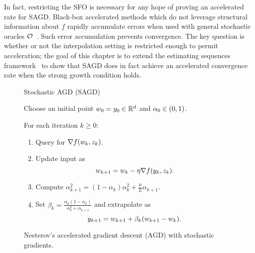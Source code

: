 In fact, restricting the \ac{SFO} is necessary for any hope of proving an accelerated rate for \ac{SAGD}.
Black-box accelerated methods which do not leverage structural information about \( f \) rapidly accumulate errors when used with general stochastic oracles \( \oracle{} \)~\citep{devolder2014first, schmidt2011convergence}. 
Such error accumulation prevents convergence. 
The key question is whether or not the interpolation setting is restricted enough to permit acceleration;
the goal of this chapter is to extend the estimating sequences framework~\citep{nesterov2004lectures} to show that \ac{SAGD} does in fact achieve an accelerated convergence rate when the strong growth condition holds.

\begin{figure}[t]
    \centering
    \begin{procedure}{Stochastic \ac{AGD} (\ac{SAGD})}
    \item Choose an initial point \( \w_0 = y_0 \in \R^d \) and \( \alpha_0 \in \rbr{0,1} \).
        \item For each iteration \( k \geq 0 \):
            \begin{enumerate}
                \item Query \oracle{} for \( \grad(\wk, \zk) \). 
                \item Update input as\vspace{-1ex}%
                \[ \wkk = \wk - \eta \grad(\yk, \zk). \]
                \item Compute 
                    \( \alpha_{k+1}^2 = (1 - \alpha_k)\alpha_k^2 + \frac{\mu}{L} \alpha_{k+1} \).
                \item Set \( \beta_{k} = \frac{\alpha_k (1-\alpha_k)}{\alpha_k^2 + \alpha_{k+1}} \) and extrapolate as
                    \[ \ykk = \wkk + \beta_k (\wkk - \wk).  \] 
            \end{enumerate}
    \end{procedure}
    \caption{Nesterov's accelerated gradient descent (AGD) with stochastic gradients.}%
    \label{procedure:accelerated-sgd}
\end{figure} 

